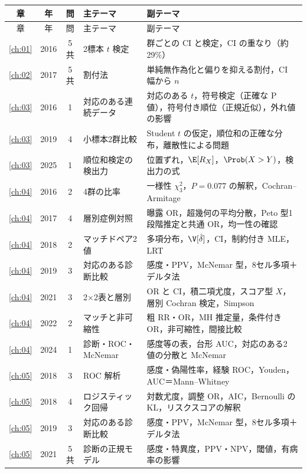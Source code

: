 \begin{center}\scriptsize
\setlength{\tabcolsep}{3pt}
\begin{longtable}{@{}cccL{36mm}L{78mm}@{}}
\toprule
章 & 年 & 問 & 主テーマ & 副テーマ\\
\midrule
\endfirsthead
\toprule
章 & 年 & 問 & 主テーマ & 副テーマ\\
\midrule
\endhead
\bottomrule
\endfoot
\ref{ch:01} & 2016 & 5共 & 2標本 $t$ 検定 & 群ごとの CI と検定，CI の重なり（約29\%）\\
\midrule
\ref{ch:02} & 2017 & 5共 & 割付法 & 単純無作為化と偏りを抑える割付，CI 幅から $n$\\
\midrule
\ref{ch:03} & 2016 & 1 & 対応のある連続データ & 対応のある $t$，符号検定（正確な P 値），符号付き順位（正規近似），外れ値の影響\\
\ref{ch:03} & 2019 & 4 & 小標本2群比較 & Student $t$ の仮定，順位和の正確な分布，離散性による問題\\
\ref{ch:03} & 2025 & 1 & 順位和検定の検出力 & 位置ずれ，$\E[R_X]$，$\Prob(X>Y)$，検出力の式\\
\midrule
\ref{ch:04} & 2016 & 2 & 4群の比率 & 一様性 $\chi^2_3$，$P=0.077$ の解釈，Cochran--Armitage\\
\ref{ch:04} & 2017 & 4 & 層別症例対照 & 曝露 OR，超幾何の平均分散，Peto 型1段階推定と共通 OR，均一性の確認\\
\ref{ch:04} & 2018 & 2 & マッチドペア2 値 & 多項分布，$\V[\hat\delta]$，CI，制約付き MLE，LRT\\
\ref{ch:04} & 2019 & 3 & 対応のある診断比較 & 感度・PPV，McNemar 型，8セル多項＋デルタ法\\
\ref{ch:04} & 2021 & 3 & 2×2表と層別 & OR と CI，積二項尤度，スコア型 $X$，層別 Cochran 検定，Simpson\\
\ref{ch:04} & 2022 & 2 & マッチと非可縮性 & 粗 RR・OR，MH 推定量，条件付き OR，非可縮性，間接比較\\
\ref{ch:04} & 2024 & 1 & 診断・ROC・McNemar & 感度等の表，台形 AUC，対応のある2 値の分散と McNemar\\
\midrule
\ref{ch:05} & 2018 & 3 & ROC 解析 & 感度・偽陽性率，経験 ROC，Youden，AUC＝Mann--Whitney\\
\ref{ch:05} & 2018 & 4 & ロジスティック回帰 & 対数尤度，調整 OR，AIC，Bernoulli の KL，リスクスコアの解釈\\
\ref{ch:05} & 2019 & 3 & 対応のある診断比較 & 感度・PPV，McNemar 型，8セル多項＋デルタ法\\
\ref{ch:05} & 2021 & 5共 & 診断の正規モデル & 感度・特異度，PPV・NPV，閾値，有病率の影響\\

\end{longtable}
\end{center}
